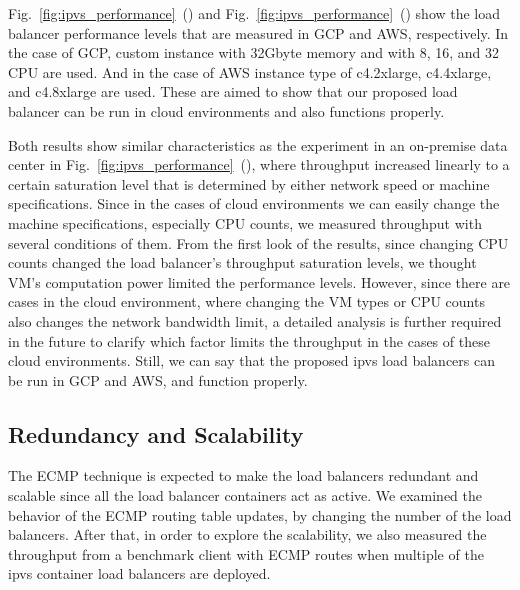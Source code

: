 Fig.~\ref{fig:ipvs_performance}~() and Fig.~\ref{fig:ipvs_performance}~() show the load balancer performance levels that are measured in GCP and AWS, respectively. In the case of GCP, custom instance with 32Gbyte memory and with 8, 16, and 32 CPU are used.
And in the case of AWS instance type of c4.2xlarge, c4.4xlarge, and c4.8xlarge are used.
These are aimed to show that our proposed load balancer can be run in cloud environments and also functions properly.

Both results show similar characteristics as the experiment in an on-premise data center in Fig.~\ref{fig:ipvs_performance}~(), where throughput increased linearly to a certain saturation level that is determined by either network speed or machine specifications.
Since in the cases of cloud environments we can easily change the machine specifications, especially CPU counts, we measured throughput with several conditions of them.
From the first look of the results, since changing CPU counts changed the load balancer's throughput saturation levels, we thought VM's computation power limited the performance levels.
However, since there are cases in the cloud environment, where changing the VM types or CPU counts also changes the network bandwidth limit, a detailed analysis is further required in the future to clarify which factor limits the throughput in the cases of these cloud environments.
Still, we can say that the proposed ipvs load balancers can be run in GCP and AWS, and function properly.


\subsection{Redundancy and Scalability}

The ECMP technique is expected to make the load balancers redundant and scalable since all the load balancer containers act as active.
We examined the behavior of the ECMP routing table updates, by changing the number of the load balancers.
After that, in order to explore the scalability, we also measured the throughput from a benchmark client with ECMP routes when multiple of the ipvs container load balancers are deployed.

